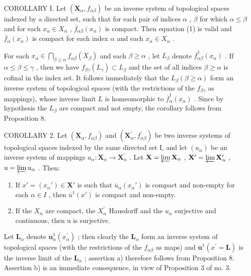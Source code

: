COROLLARY I. Let \((\mathbf{X}_{\alpha}, f_{\alpha\beta})\) be an inverse system of topological spaces indexed by a directed set, such that for each pair of indices \(\alpha\) , \(\beta\) for which \(\alpha \leqslant \beta\) and for each \(x_{\alpha} \in X_{\alpha}\) , \(\overline{f}_{\alpha\beta}(x_{\alpha})\) is compact. Then equation (1) is valid and \(\overline{f}_{\alpha}(x_{\alpha})\) is compact for each index \(\alpha\) and each \(x_{\alpha} \in X_{\alpha}\) .

For each \(x_{\alpha} \in \bigcap_{\beta \geqslant \alpha} f_{\alpha \beta}(X_{\beta})\) and each \(\beta \geqslant \alpha\) , let \(L_{\beta}\) denote \(\overline{f}_{\alpha \beta}^{1}(x_{\alpha})\) . If \(\alpha \leqslant \beta \leqslant \gamma\) , then we have \(f_{\beta \gamma}(L_{\gamma}) \subset L_{\beta}\) and the set of all indices \(\beta \geqslant \alpha\) is cofinal in the index set. It follows immediately that the \(L_{\beta} (\beta \geqslant \alpha)\) form an inverse system of topological spaces (with the restrictions of the \(f_{\beta \gamma}\) as mappings), whose inverse limit \(L\) is homeomorphic to \(\overline{f}_{\alpha}^{1}(x_{\alpha})\) . Since by hypothesis the \(L_{\beta}\) are compact and not empty, the corollary follows from Proposition 8.

COROLLARY 2. Let \((\mathbf{X}_{\alpha}, f_{\alpha \beta})\) and \((\mathbf{X}_{\alpha}^{\prime}, f_{\alpha \beta}^{\prime})\) be two inverse systems of topological spaces indexed by the same directed set I, and let \((u_{\alpha})\) be an inverse system of mappings \(u_{\alpha}: \mathbf{X}_{\alpha} \to \mathbf{X}_{\alpha}^{\prime}\) . Let \(\mathbf{X} = \varprojlim \mathbf{X}_{\alpha}\) , \(\mathbf{X}^{\prime} = \varprojlim \mathbf{X}_{\alpha}^{\prime}\) , \(u = \varprojlim u_{\alpha}\) . Then:

\begin{enumerate}
\def\labelenumi{\alph{enumi})}
\item
  If \(x' = (x_{\alpha}') \in \mathbf{X}'\) is such that \(\overline{u}_{\alpha}(x_{\alpha}')\) is compact and non-empty for each \(\alpha \in I\) , then \(\overline{u}^1(x')\) is compact and non-empty.
\item
  If the \(X_{\alpha}\) are compact, the \(X_{\alpha}^{\prime}\) Hausdorff and the \(u_{\alpha}\) surjective and continuous, then u is surjective.
\end{enumerate}

Let \(\mathbf{L}_{\alpha}\) denote \(\overline{\boldsymbol{u}}_{\alpha}^{1}(x_{\alpha}^{\prime})\) ; then clearly the \(\mathbf{L}_{\alpha}\) form an inverse system of topological spaces (with the restrictions of the \(f_{\alpha \beta}\) as maps) and \(\overline{\boldsymbol{u}}^{1}(x^{\prime} = \mathbf{L})\) is the inverse limit of the \(\mathbf{L}_{\alpha}\) ; assertion a) therefore follows from Proposition 8. Assertion b) is an immediate consequence, in view of Proposition 3 of no. 3.

